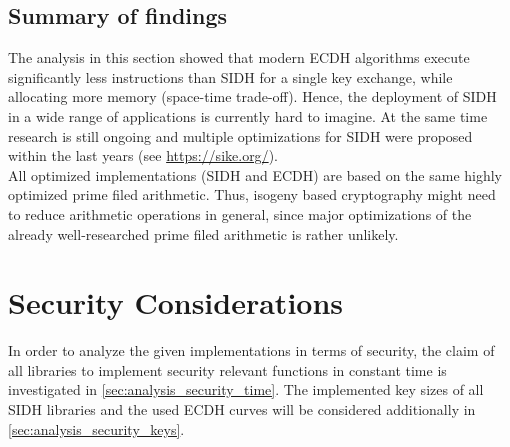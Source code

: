 \subsection{Summary of findings}

The analysis in this section showed that modern \gls{ECDH} algorithms execute significantly less instructions than \gls{SIDH} for a single key exchange, while allocating more memory (space-time trade-off). Hence, the deployment of \gls{SIDH} in a wide range of applications is currently hard to imagine. At the same time research is still ongoing and multiple optimizations for \gls{SIDH} were proposed within the last years (see \url{https://sike.org/}).\\
All optimized implementations (\gls{SIDH} and \gls{ECDH}) are based on the same highly optimized prime filed arithmetic. Thus, isogeny based cryptography might need to reduce arithmetic operations in general, since major optimizations of the already well-researched prime filed arithmetic is rather unlikely.

\section{Security Considerations}\label{sec:analysis_security}

In order to analyze the given implementations in terms of security, the claim of all libraries to implement security relevant functions in constant time is investigated in \autoref{sec:analysis_security_time}. The implemented key sizes of all \gls{SIDH} libraries and the used \gls{ECDH} curves will be considered additionally in \autoref{sec:analysis_security_keys}.

